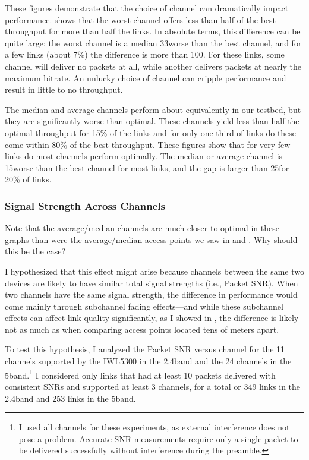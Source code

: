 These figures demonstrate that the choice of channel can dramatically impact performance.  shows that the worst channel offers less than half of the best throughput for more than half the links. In absolute terms, this difference can be quite large: the worst channel is a median 33\Mbps worse than the best channel, and for a few links (about 7\%) the difference is more than 100\Mbps. For these links, some channel will deliver no packets at all, while another delivers packets at nearly the maximum bitrate. An unlucky choice of channel can cripple performance and result in little to no throughput.

The median and average channels perform about equivalently in our testbed, but they are significantly worse than optimal. These channels yield less than half the optimal throughput for 15\% of the links and for only one third of links do these come within 80\% of the best throughput. These figures show that for very few links do most channels perform optimally. The median or average channel is 15\Mbps worse than the best channel for most links, and the gap is larger than 25\Mbps for 20\% of links.

\subsubsection{Signal Strength Across Channels}
Note that the average/median channels are much closer to optimal in these graphs than were the average/median access points we saw in  and . Why should this be the case?

I hypothesized that this effect might arise because channels between the same two devices are likely to have similar total signal strengths (i.e., Packet SNR). When two channels have the same signal strength, the difference in performance would come mainly through subchannel fading effects---and while these subchannel effects can affect link quality significantly, as I showed in , the difference is likely not as much as when comparing access points located tens of meters apart.

To test this hypothesis, I analyzed the Packet SNR versus channel for the 11 channels supported by the IWL5300 in the 2.4\GHz band and the 24 channels in the 5\GHz band.\footnote{I used all channels for these experiments, as external interference does not pose a problem. Accurate SNR measurements require only a single packet to be delivered successfully without interference during the preamble.} I considered only links that had at least 10 packets delivered with consistent SNRs and supported at least 3 channels, for a total or 349 links in the 2.4\GHz band and 253 links in the 5\GHz band.

